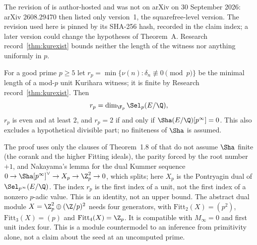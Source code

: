 The revision of \cite{clw} is author-hosted and was not on arXiv on 30 September 2026: arXiv 2608.29470 then listed only version~1, the squarefree-level version. The revision used here is pinned by its SHA-256 hash, recorded in the claim index; a later version could change the hypotheses of Theorem~A. Research record~\ref{thm:kurexist} bounds neither the length of the witness nor anything uniformly in $p$.

\begin{researchrecord}\label{thm:rp}
For a good prime $p\ge5$ let $r_p=\min\{\nu(n):\delta_n\not\equiv0\pmod p\}$ be the minimal length of a mod-$p$ unit Kurihara witness; it is finite by Research record~\ref{thm:kurexist}. Then
\[
r_p=\dim_{\F_p}\Sel_p(E/\Q),
\]
$r_p$ is even and at least $2$, and $r_p=2$ if and only if $\Sha(E/\Q)[p^\infty]=0$. This also excludes a hypothetical divisible part; no finiteness of $\Sha$ is assumed.
\end{researchrecord}
The proof uses only the clauses of Theorem~1.8 of \cite{kimch} that do not assume $\Sha$ finite (the corank and the higher Fitting ideals), the parity forced by the root number $+1$, and Nakayama's lemma for the dual Kummer sequence $0\to\Sha[p^\infty]^\vee\to X_p\to\Z_p^2\to0$, which splits; here $X_p$ is the Pontryagin dual of $\Sel_{p^\infty}(E/\Q)$. The index $r_p$ is the first index of a unit, not the first index of a nonzero $p$-adic value. This is an identity, not an upper bound. The abstract dual module $X=\Z_p^2\oplus(\Z/p)^2$ needs four generators, with $\mathrm{Fitt}_2(X)=(p^2)$, $\mathrm{Fitt}_3(X)=(p)$ and $\mathrm{Fitt}_4(X)=\Z_p$. It is compatible with $M_\infty=0$ and first unit index four. This is a module countermodel to an inference from primitivity alone, not a claim about the seed at an uncomputed prime.

